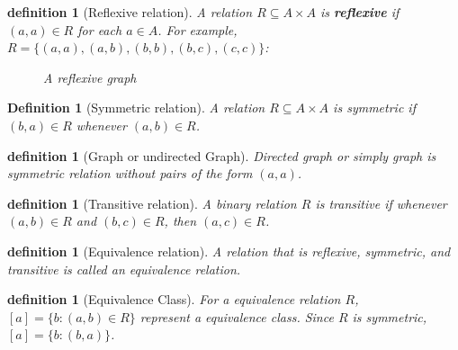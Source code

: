 \newtheorem{reflexivegraph}[theorem_root]{definition}
\begin{reflexivegraph}[Reflexive relation]
A relation $R\subseteq A\times A$ is {\bf reflexive} if $(a, a) \in R$ for each $a\in A$.
For example, $R = \{(a,a), (a,b), (b, b), (b, c), (c, c)\}$:
\begin{figure}[H]
\begin{center}
\end{center}
\caption{A reflexive graph}
\label{fig:refexive-graph}
\end{figure}
\end{reflexivegraph}

\newtheorem{symmetricgraph}[theorem_root]{Definition}
\begin{symmetricgraph}[Symmetric relation]
A relation $R\subseteq A\times A$ is symmetric if $(b, a)\in R$ whenever $(a,b)\in R$.
\end{symmetricgraph}

\newtheorem{undirectedgraph}[theorem_root]{definition}
\begin{undirectedgraph}[Graph or undirected Graph]
Directed graph or simply graph is symmetric relation without pairs of the form $(a,a)$.
\end{undirectedgraph}

\newtheorem{transitiverelation}[theorem_root]{definition}
\begin{transitiverelation}[Transitive relation]
A binary relation $R$ is transitive if whenever $(a,b)\in R$ and $(b,c)\in R$, then
$(a, c)\in R$.
\end{transitiverelation}

\newtheorem{equivalencerelation}[theorem_root]{definition}
\begin{equivalencerelation}[Equivalence relation]
A relation that is reflexive, symmetric, and transitive is called an equivalence relation.
\end{equivalencerelation}

\newtheorem{equivalenceclass}[theorem_root]{definition}
\begin{equivalenceclass}[Equivalence Class]
    For a equivalence relation $R$, $[a] = \{b: (a,b)\in R\}$ represent a equivalence class.
    Since $R$ is symmetric, $[a] = \{b: (b, a)\}$.
\end{equivalenceclass}

